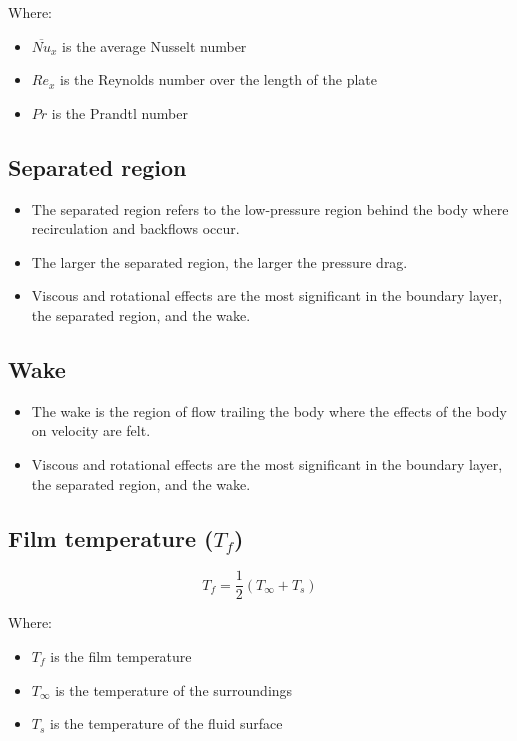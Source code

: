 \documentclass[11pt]{article}
\begin{document}
Where:
\begin{itemize}
\item \(\overline{Nu}_x\) is the average Nusselt number
\item \(Re_x\) is the Reynolds number over the length of the plate
\item \(Pr\) is the Prandtl number
\end{itemize}
\subsection{Separated region}
\label{sec:orgd818c8c}
\begin{itemize}
\item The separated region refers to the low-pressure region behind the body where recirculation and backflows occur.
\item The larger the separated region, the larger the pressure drag.
\item Viscous and rotational effects are the most significant in the boundary layer, the separated region, and the wake.
\end{itemize}
\subsection{Wake}
\label{sec:org3be9560}
\begin{itemize}
\item The wake is the region of flow trailing the body where the effects of the body on velocity are felt.
\item Viscous and rotational effects are the most significant in the boundary layer, the separated region, and the wake.
\end{itemize}
\subsection{Film temperature (\(T_f\))}
\label{sec:org0c51cbe}
\[T_f = \frac{1}{2} (T_{\infty} + T_s)\]

Where:
\begin{itemize}
\item \(T_f\) is the film temperature
\item \(T_{\infty}\) is the temperature of the surroundings
\item \(T_s\) is the temperature of the fluid surface
\end{itemize}
\end{document}
